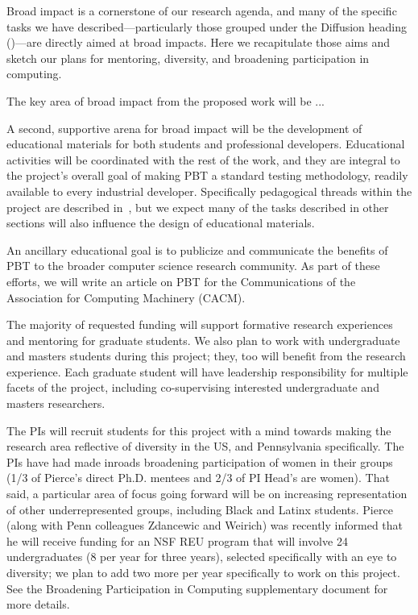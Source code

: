 


Broad impact is a cornerstone of our research agenda, and many of the
specific tasks we have described---particularly those grouped under
the Diffusion heading ()---are directly
aimed at broad impacts.  Here we recapitulate those aims and sketch
our plans for mentoring, diversity, and broadening participation in
computing.

 The key area of broad impact from
the proposed work will be ...   \smallskip

%
A second, supportive arena for broad impact will be the
development of educational materials for both students and
professional developers. Educational activities will be
coordinated with the rest of the work, and they are integral to the
project's overall goal of making PBT a standard testing methodology,
readily available to every industrial developer.  Specifically pedagogical
threads within the project are described
in~, but we expect many of the tasks
described in other sections will also
influence the design of educational materials.

An ancillary educational goal is to
publicize and communicate the benefits of PBT to the broader computer science
research community. As part of these efforts, we will write an article on PBT
for the Communications of the Association for Computing Machinery
(CACM). \iflater{}\fi

\smallskip
{}
%
The majority of requested funding will support formative research
experiences and mentoring for graduate students. We
also plan to work with undergraduate and masters students during this project;
they, too will benefit from the research experience. Each graduate
student will have leadership responsibility for multiple facets of the
project, including co-supervising interested undergraduate and masters
researchers.

The PIs will recruit students for this project with a mind towards making
the research area reflective of diversity in the US, and Pennsylvania specifically.
The PIs have had made inroads broadening participation of women in their
groups (1/3 of Pierce's direct Ph.D. mentees and 2/3 of PI
Head's are women). That said, a particular area of focus going forward
will be on increasing representation of
other underrepresented groups, including Black and Latinx students. Pierce (along with Penn colleagues Zdancewic and Weirich)
was recently informed that he will receive funding for an
NSF REU program that will involve 24 undergraduates (8 per
year for three years), selected specifically with an eye to diversity;
we plan to add two more per year specifically to work on this
project. See the Broadening Participation in Computing supplementary
document for more details.

